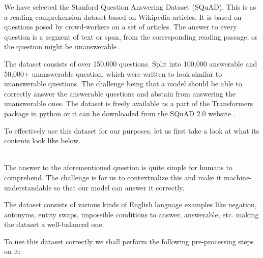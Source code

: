 \documentclass[a4paper,12pt]{report}
\begin{document}
    	We have selected the Stanford Question Answering Dataset (SQuAD). This is as a reading comprehension dataset based on Wikipedia articles. It is based on questions posed by crowd-workers on a set of articles. The answer to every question is a segment of text or span, from the corresponding reading passage, or the question might be unanswerable \citep{dataset}.

    	The dataset consists of over 150,000 questions. Split into 100,000 answerable and 50,000+ unanswerable question, which were written to look similar to unanswerable questions. The challenge being that a model should be able to correctly answer the answerable questions and abstain from answering the unanswerable ones.
	    The dataset is freely available as a part of the Transformers package in python or it can be downloaded from the SQuAD 2.0 website \citep{squad}.

	    To effectively use this dataset for our purposes, let us first take a look at what its contents look like below.\\ \\
	    \noindent{}
	    \newline
	    \newline

	    The answer to the aforementioned question is quite simple for humans to comprehend. The challenge is for us to contextualize this and make it machine-understandable so that our model can answer it correctly.

	    The dataset consists of various kinds of English language examples like negation, antonyms, entity swaps, impossible conditions to answer, answerable, etc. making the dataset a well-balanced one.

	    To use this dataset correctly we shall perform the following pre-processing steps on it:
\end{document}
